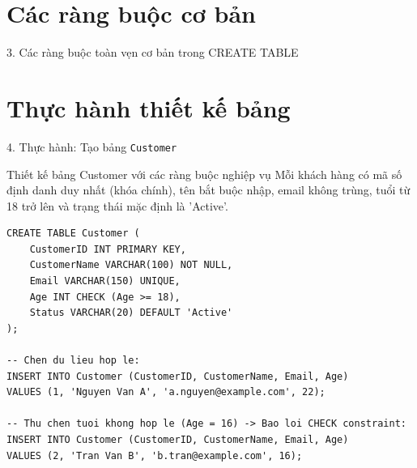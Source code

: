 \documentclass[aspectratio=169,11pt]{beamer}
\begin{document}
\section{Các ràng buộc cơ bản}
\begin{frame}{3. Các ràng buộc toàn vẹn cơ bản trong CREATE TABLE}
\begin{center}
\end{center}
\end{frame}

\section{Thực hành thiết kế bảng}
\begin{frame}[fragile]{4. Thực hành: Tạo bảng \texttt{Customer}}
\begin{block}{Thiết kế bảng Customer với các ràng buộc nghiệp vụ}
  Mỗi khách hàng có mã số định danh duy nhất (khóa chính), tên bắt buộc nhập, email không trùng, tuổi từ 18 trở lên và trạng thái mặc định là 'Active'.
\end{block}

\begin{lstlisting}
CREATE TABLE Customer (
    CustomerID INT PRIMARY KEY,
    CustomerName VARCHAR(100) NOT NULL,
    Email VARCHAR(150) UNIQUE,
    Age INT CHECK (Age >= 18),
    Status VARCHAR(20) DEFAULT 'Active'
);

-- Chen du lieu hop le:
INSERT INTO Customer (CustomerID, CustomerName, Email, Age)
VALUES (1, 'Nguyen Van A', 'a.nguyen@example.com', 22);

-- Thu chen tuoi khong hop le (Age = 16) -> Bao loi CHECK constraint:
INSERT INTO Customer (CustomerID, CustomerName, Email, Age)
VALUES (2, 'Tran Van B', 'b.tran@example.com', 16);
\end{lstlisting}
\end{frame}
\end{document}
